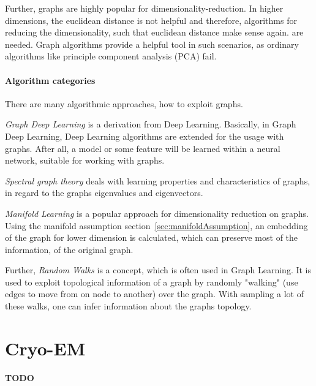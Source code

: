 Further, graphs are highly popular for dimensionality-reduction. In higher dimensions, the euclidean distance is not helpful and therefore,
algorithms for reducing the dimensionality, such that euclidean distance make sense again. are needed. 
Graph algorithms provide a helpful tool in such scenarios, as ordinary algorithms like principle component analysis (PCA) fail.

\paragraph{Algorithm categories}

There are many algorithmic approaches, how to exploit graphs. 

\textit{Graph Deep Learning} is a derivation from Deep Learning. 
Basically, in Graph Deep Learning, Deep Learning algorithms are extended for the usage with graphs.
After all, a model or some feature will be learned within a neural network, suitable for working with graphs.

\textit{Spectral graph theory}\cite{SpectralGraphTheory} deals with learning properties and characteristics of graphs, in regard to
the graphs eigenvalues and eigenvectors. 

\textit{Manifold Learning }\cite{ManifoldLearning} is a popular approach for dimensionality reduction on graphs. 
Using the manifold assumption section~\ref{sec:manifoldAssumption}, an embedding of the graph for lower dimension is calculated,
which can preserve most of the information, of the original graph.

Further, \textit{Random Walks} is a concept, which is often used in Graph Learning. 
It is used to exploit topological information of a graph by randomly "walking" (use edges to move from on node to another)
over the graph. With sampling a lot of these walks, one can infer information about the graphs topology.


\section{Cryo-EM}
\textbf{TODO}



